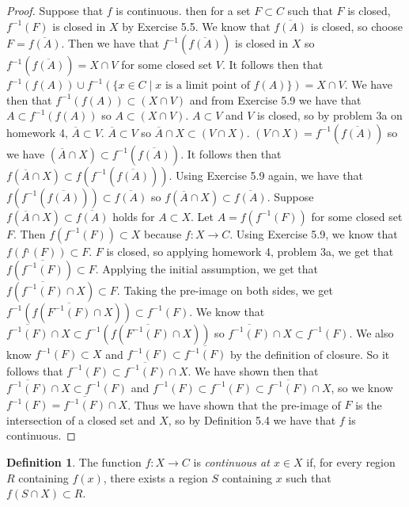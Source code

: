 \documentclass[12pt]{article}
\renewcommand{\_}[1]{\underline{ #1 }}
\theoremstyle{definition}
\newtheorem{definition}[theorem]{Definition}
\numberwithin{equation}{subsection}
\begin{document}
\begin{proof}
Suppose that $f$ is continuous. then for a set $F \subset C$ such that $F$ is closed, $f^{-1}(F)$ is closed in $X$ by Exercise 5.5. We know that $\overline{f(A)}$ is closed, so choose $F = \overline{f(A)}$. Then we have that $f^{-1}(\overline{f(A)})$ is closed in $X$ so $f^{-1}(\overline{f(A)}) = X \cap V$ for some closed set $V$. It follows then that $f^{-1}(f(A)) \cup f^{-1}(\{x \in C \mid x \text{ is a limit point of } f(A)\}) = X \cap V$. We have then that $f^{-1}(f(A)) \subset (X \cap V)$ and from Exercise 5.9 we have that $A \subset f^{-1}(f(A))$ so $A \subset (X \cap V)$. $A \subset V$ and $V$ is closed, so by problem 3a on homework 4, $\overline{A} \subset V$. $\overline{A} \subset V$ so $\overline{A} \cap X \subset (V \cap X)$. $(V \cap X) = f^{-1}(\overline{f(A)})$ so we have $(\overline{A} \cap X) \subset f^{-1}(\overline{f(A)})$. It follows then that $f(\overline{A} \cap X) \subset f(f^{-1}(\overline{f(A)}))$. Using Exercise 5.9 again, we have that $f(f^{-1}(\overline{f(A)})) \subset \overline{f(A)}$ so $f(\overline{A} \cap X) \subset \overline{f(A)}$.
\newline Suppose $f(\overline{A} \cap X) \subset \overline{f(A)}$ holds for $A \subset X$. Let $A = f(f^{-1}(F))$ for some closed set $F$. Then $f(f^{-1}(F)) \subset X$ because $f : X \to C$.  Using Exercise 5.9, we know that $f(f^{_1}(F)) \subset F$. $F$ is closed, so applying homework 4, problem 3a, we get that $f(\overline{f^{-1}(F)}) \subset F$. Applying the initial assumption, we get that $f(\overline{f^{-1}(F)} \cap X) \subset F$. Taking the pre-image on both sides, we get $f^{-1}(f(\overline{F^{-1}(F)} \cap X)) \subset f^{-1}(F)$. We know that $\overline{f^{-1}(F)} \cap X \subset f^{-1}(f(\overline{F^{-1}(F)} \cap X))$ so $\overline{f^{-1}(F)} \cap X \subset f^{-1}(F)$. We also know $f^{-1}(F) \subset X$ and $f^{-1}(F) \subset \overline{f^{-1}(F)}$ by the definition of closure. So it follows that $f^{-1}(F) \subset \overline{f^{-1}(F)} \cap X$. We have shown then that $\overline{f^{-1}(F)} \cap X \subset f^{-1}(F)$ and $f^{-1}(F) \subset f^{-1}(F) \subset \overline{f^{-1}(F)} \cap X$, so we know $f^{-1}(F) = \overline{f^{-1}(F)} \cap X$. Thus we have shown that the pre-image of $F$ is the intersection of a closed set and $X$, so by Definition 5.4 we have that $f$ is continuous.
\end{proof}

\begin{definition}
The function $f\colon X\to C$ is {\em continuous at $x\in X$} if, 
for every region $R$ containing $f(x)$, there exists a region $S$ containing $x$ such that $f(S\cap X)\subset R$.
\end{definition}
\end{document}
